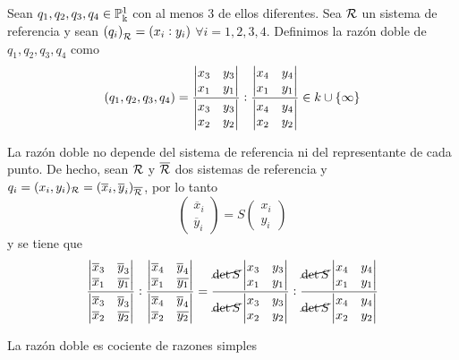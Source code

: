 \begin{defi}
  Sean $q_1, q_2, q_3, q_4 \in \mathbb{P}^1_\Bbbk$ con al menos 3 de ellos diferentes. Sea
  $\mathcal{R}$ un sistema de referencia y sean $\left( q_i \right)_{\mathcal{R}} = (x_i:y_i)$
  $\forall i=1,2,3,4$. Definimos la razón doble de $q_1,q_2,q_3,q_4$ como
  \[
    \left( q_1,q_2,q_3,q_4 \right) = \frac{\begin{vmatrix}x_3 & y_3 \\ x_1 & y_1\end{vmatrix}}
    {\begin{vmatrix}x_3 & y_3 \\ x_2 & y_2\end{vmatrix}}:\frac{\begin{vmatrix}x_4 & y_4 \\ x_1 & y_1\end{vmatrix}}
    {\begin{vmatrix}x_4 & y_4 \\ x_2 & y_2\end{vmatrix}} \in k \cup \left\{\infty\right\}
  \]
\end{defi}
\begin{obs}
  La razón doble no depende del sistema de referencia ni del representante
  de cada punto. De hecho, sean $\mathcal{R}$ y $\overline{\mathcal{R}}$ dos sistemas de referencia
  y $q_i = (x_i, y_i)_{\mathcal{R}} = (\overline{x}_i, \overline{y}_i)_{\overline{\mathcal{R}}}$, por lo tanto
  \[
    \begin{pmatrix} \overline{x}_i \\ \overline{y}_i \end{pmatrix} = S \begin{pmatrix}
      x_i \\ y_i \end{pmatrix}
  \]
  y se tiene que
  \[
    \frac{\begin{vmatrix}\overline{x}_3 & \overline{y}_3 \\ \overline{x}_1 & \overline{y_1}\end{vmatrix}}
    {\begin{vmatrix}\overline{x}_3 & \overline{y}_3 \\ \overline{x}_2 & \overline{y_2}\end{vmatrix}}:
    \frac{\begin{vmatrix}\overline{x}_4 & \overline{y}_4 \\ \overline{x}_1 & \overline{y_1}\end{vmatrix}}
    {\begin{vmatrix}\overline{x}_4 & \overline{y}_4 \\ \overline{x}_2 & \overline{y_2}\end{vmatrix}}
    =
    \frac{\cancel{\det S}\begin{vmatrix}x_3 & y_3 \\ x_1 & y_1\end{vmatrix}}
    {\cancel{\det S} \begin{vmatrix}x_3 & y_3 \\ x_2 & y_2\end{vmatrix}}:
    \frac{\cancel{\det S} \begin{vmatrix}x_4 & y_4 \\ x_1 & y_1\end{vmatrix}}
    {\cancel{\det S} \begin{vmatrix}x_4 & y_4 \\ x_2 & y_2\end{vmatrix}}
  \]
\end{obs}
\begin{obs}
  La razón doble es cociente de razones simples
\end{obs}
